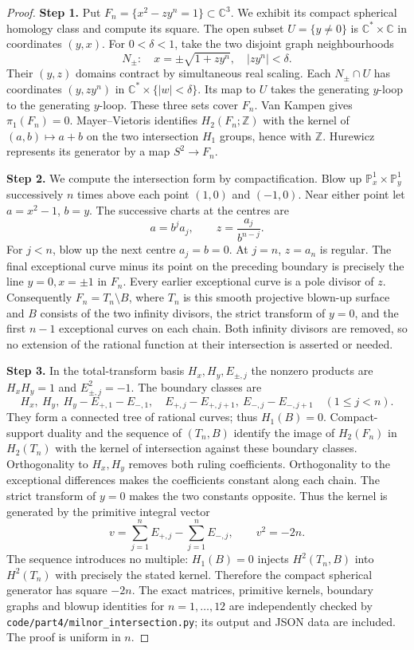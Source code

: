 \begin{proof}
\noindent\textbf{Step 1.} Put $F_n=\{x^2-zy^n=1\}\subset\mathbb C^3$. We exhibit its
compact spherical homology class and compute its square.
The open subset $U=\{y\ne0\}$ is
$\mathbb C^*\times\mathbb C$ in coordinates $(y,x)$.
For $0<\delta<1$, take the two disjoint graph neighbourhoods
\[
 N_\pm:\quad x=\pm\sqrt{1+zy^n},\quad |zy^n|<\delta.
\]
Their $(y,z)$ domains contract by simultaneous real scaling.
Each $N_\pm\cap U$ has coordinates $(y,zy^n)$ in
$\mathbb C^*\times\{|w|<\delta\}$. Its map to $U$ takes
the generating $y$-loop to the generating $y$-loop. These three
sets cover $F_n$. Van Kampen gives $\pi_1(F_n)=0$.
Mayer--Vietoris identifies $H_2(F_n;\mathbb Z)$ with the
kernel of $(a,b)\mapsto a+b$ on the two intersection
$H_1$ groups, hence with $\mathbb Z$. Hurewicz represents its
generator by a map $S^2\to F_n$.

\noindent\textbf{Step 2.} We compute the intersection form by compactification. Blow up
$\mathbb P^1_x\times\mathbb P^1_y$ successively $n$ times above
each point $(1,0)$ and $(-1,0)$. Near either point let
$a=x^2-1$, $b=y$. The successive charts at the centres are
\[
 a=b^j a_j,\qquad z=\frac{a_j}{b^{n-j}}.
\]
For $j<n$, blow up the next centre $a_j=b=0$.
At $j=n$, $z=a_n$ is regular. The final exceptional curve
minus its point on the preceding boundary is precisely the
line $y=0,x=\pm1$ in $F_n$. Every earlier exceptional curve
is a pole divisor of $z$. Consequently $F_n=T_n\setminus B$,
where $T_n$ is this smooth projective blown-up surface and
$B$ consists of the two infinity divisors, the strict transform
of $y=0$, and the first $n-1$ exceptional curves on each chain.
Both infinity divisors are removed, so no extension of the
rational function at their intersection is asserted or needed.

\noindent\textbf{Step 3.} In the total-transform basis $H_x,H_y,E_{\pm,j}$ the nonzero
products are $H_xH_y=1$ and $E_{\pm,j}^2=-1$. The boundary
classes are
\[
 H_x,\ H_y,\ H_y-E_{+,1}-E_{-,1},\quad
 E_{+,j}-E_{+,j+1},\ E_{-,j}-E_{-,j+1}\quad(1\leq j<n).
\]
They form a connected tree of rational curves; thus $H_1(B)=0$.
Compact-support duality and the sequence of $(T_n,B)$ identify
the image of $H_2(F_n)$ in $H_2(T_n)$ with the kernel of
intersection against these boundary classes. Orthogonality to
$H_x,H_y$ removes both ruling coefficients. Orthogonality to
the exceptional differences makes the coefficients constant
along each chain. The strict transform of $y=0$ makes the two
constants opposite. Thus the kernel is generated by the
primitive integral vector
\[
 v=\sum_{j=1}^n E_{+,j}-\sum_{j=1}^n E_{-,j},\qquad v^2=-2n.
\]
The sequence introduces no multiple: $H_1(B)=0$ injects
$H^2(T_n,B)$ into $H^2(T_n)$ with precisely the stated kernel.
Therefore the compact spherical generator has square $-2n$.
The exact matrices, primitive kernels, boundary graphs and
blowup identities for $n=1,\ldots,12$ are independently checked
by \texttt{code/part4/milnor\_intersection.py}; its output and
JSON data are included. The proof is uniform in $n$.


\end{proof}
